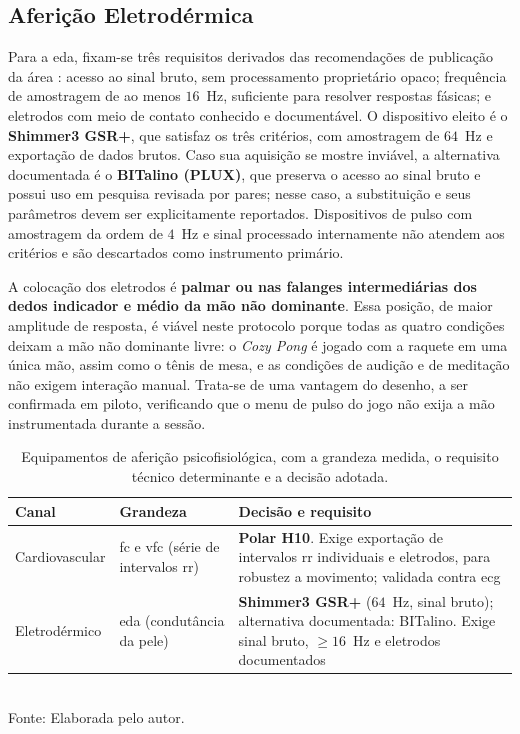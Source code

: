 \subsection{Aferição Eletrodérmica}\label{subsec:equip-eda}

Para a \gls{eda}, fixam-se três requisitos derivados das recomendações de publicação da área \citep{Boucsein2012}: acesso ao sinal bruto, sem processamento proprietário opaco; frequência de amostragem de ao menos $16$~Hz, suficiente para resolver respostas fásicas; e eletrodos com meio de contato conhecido e documentável. O dispositivo eleito é o \textbf{Shimmer3 GSR+}, que satisfaz os três critérios, com amostragem de $64$~Hz e exportação de dados brutos. Caso sua aquisição se mostre inviável, a alternativa documentada é o \textbf{BITalino (PLUX)}, que preserva o acesso ao sinal bruto e possui uso em pesquisa revisada por pares; nesse caso, a substituição e seus parâmetros devem ser explicitamente reportados. Dispositivos de pulso com amostragem da ordem de $4$~Hz e sinal processado internamente não atendem aos critérios e são descartados como instrumento primário.

A colocação dos eletrodos é \textbf{palmar ou nas falanges intermediárias dos dedos indicador e médio da mão não dominante}. Essa posição, de maior amplitude de resposta, é viável neste protocolo porque todas as quatro condições deixam a mão não dominante livre: o \textit{Cozy Pong} é jogado com a raquete em uma única mão, assim como o tênis de mesa, e as condições de audição e de meditação não exigem interação manual. Trata-se de uma vantagem do desenho, a ser confirmada em piloto, verificando que o menu de pulso do jogo não exija a mão instrumentada durante a sessão.

\begin{table}[H]
    \centering
    \caption{Equipamentos de aferição psicofisiológica, com a grandeza medida, o requisito técnico determinante e a decisão adotada.}
    \label{tab:equipamentos}
    \small
    \begin{tabularx}{\textwidth}{p{2.6cm}p{3.0cm}Y}
        \toprule
        \textbf{Canal} & \textbf{Grandeza} & \textbf{Decisão e requisito} \\
        \midrule
        Cardiovascular & \gls{fc} e \gls{vfc} (série de intervalos \gls{rr}) & \textbf{Polar H10}. Exige exportação de intervalos \gls{rr} individuais e eletrodos, para robustez a movimento; validada contra \gls{ecg} \citep{Schaffarczyk2022} \\
        \addlinespace
        Eletrodérmico & \gls{eda} (condutância da pele) & \textbf{Shimmer3 GSR+} ($64$~Hz, sinal bruto); alternativa documentada: BITalino. Exige sinal bruto, $\geq 16$~Hz e eletrodos documentados \citep{Boucsein2012} \\
        \bottomrule
    \end{tabularx}\\[2pt]
    {\footnotesize Fonte: Elaborada pelo autor.}
\end{table}

